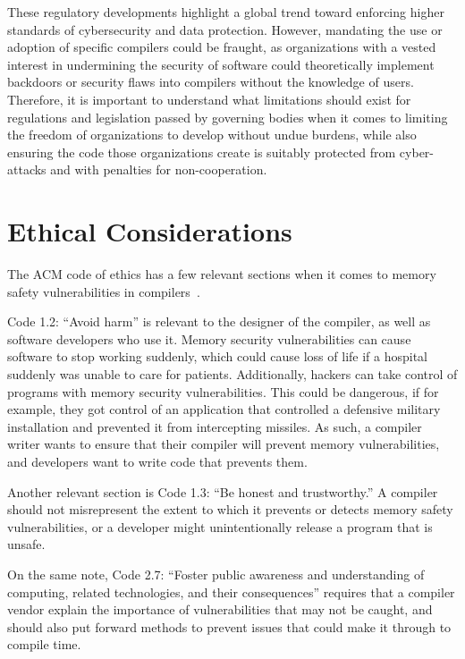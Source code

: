 \documentclass[sigconf, anonymous]{acmart}
\begin{document}
These regulatory developments highlight a global trend toward enforcing higher standards of cybersecurity and data protection. However, mandating the use or adoption of specific compilers could be fraught, as organizations with a vested interest in undermining the security of software could theoretically implement backdoors or security flaws into compilers without the knowledge of users. Therefore, it is important to understand what limitations should exist for regulations and legislation passed by governing bodies when it comes to limiting the freedom of organizations to develop without undue burdens, while also ensuring the code those organizations create is suitably protected from cyber-attacks and with penalties for non-cooperation.


\section{Ethical Considerations}
\label{ethical considerations}

The ACM code of ethics has a few relevant sections when it comes to memory safety vulnerabilities in compilers~\cite{ACMCODE}.

Code 1.2: “Avoid harm” is relevant to the designer of the compiler, as well as software developers who use it. Memory security vulnerabilities can cause software to stop working suddenly, which could cause loss of life if a hospital suddenly was unable to care for patients. Additionally, hackers can take control of programs with memory security vulnerabilities. This could be dangerous, if for example, they got control of an application that controlled a defensive military installation and prevented it from intercepting missiles. As such, a compiler writer wants to ensure that their compiler will prevent memory vulnerabilities, and developers want to write code that prevents them. 

Another relevant section is Code 1.3: “Be honest and trustworthy.” A compiler should not misrepresent the extent to which it prevents or detects memory safety vulnerabilities, or a developer might unintentionally release a program that is unsafe. 

On the same note, Code 2.7: “Foster public awareness and understanding of computing, related technologies, and their consequences” requires that a compiler vendor explain the importance of vulnerabilities that may not be caught, and should also put forward methods to prevent issues that could make it through to compile time. 
\end{document}
